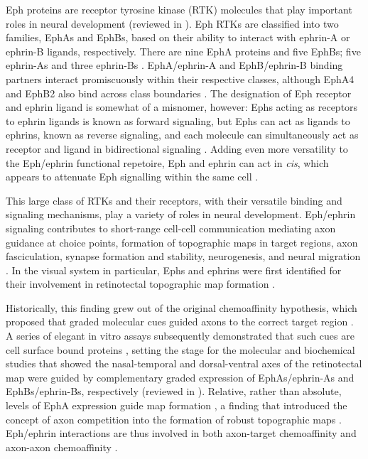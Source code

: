 Eph proteins are receptor tyrosine kinase (RTK) molecules that play important roles in neural development (reviewed in ).
Eph RTKs are classified into two families, EphAs and EphBs, based on their ability to interact with ephrin-A or ephrin-B ligands, respectively.
There are nine EphA proteins and five EphBs; five ephrin-As and three ephrin-Bs \cite{lisabeth2013eph,kania2016mechanisms}.
EphA/ephrin-A and EphB/ephrin-B binding partners interact promiscuously within their respective classes, although EphA4 and EphB2 also bind across class boundaries \cite{lisabeth2013eph,kania2016mechanisms}.
The designation of Eph receptor and ephrin ligand is somewhat of a misnomer, however: Ephs acting as receptors to ephrin ligands is known as forward signaling, but Ephs can act as ligands to ephrins, known as reverse signaling, and each molecule can simultaneously act as receptor and ligand in bidirectional signaling \cite{kania2016mechanisms,egea2007bidirectional}.
Adding even more versatility to the Eph/ephrin functional repetoire, Eph and ephrin can act in \emph{cis}, which appears to attenuate Eph signalling within the same cell \cite{marquardt2005coexpressed,kao2011ephrin,carvalho2006silencing}.

This large class of RTKs and their receptors, with their versatile binding and signaling mechanisms, play a variety of roles in neural development.
Eph/ephrin signaling contributes to short-range cell-cell communication mediating axon guidance at choice points, formation of topographic maps in target regions, axon fasciculation, synapse formation and stability, neurogenesis, and neural migration \cite{kania2016mechanisms,klein2014ephrin}.
In the visual system in particular, Ephs and ephrins were first identified for their involvement in retinotectal topographic map formation \cite{cheng1995complementary,drescher1995vitro}.

Historically, this finding grew out of the original chemoaffinity hypothesis, which proposed that graded molecular cues guided axons to the correct target region \cite{attardi1963preferential,sperry1963chemoaffinity}.
A series of elegant in vitro assays subsequently demonstrated that such cues are cell surface bound proteins \cite{walter1987recognition,walter1987avoidance,walter1990axonal}, setting the stage for the molecular and biochemical studies that showed the nasal-temporal and dorsal-ventral axes of the retinotectal map were guided by complementary graded expression of EphAs/ephrin-As and EphBs/ephrin-Bs, respectively (reviewed in ).
Relative, rather than absolute, levels of EphA expression guide map formation \cite{brown2000topographic}, a finding that introduced the concept of axon competition into the formation of robust topographic maps \cite{feldheim2010visual,triplett2012eph}.
Eph/ephrin interactions are thus involved in both axon-target chemoaffinity and axon-axon chemoaffinity \cite{weth2014chemoaffinity}.